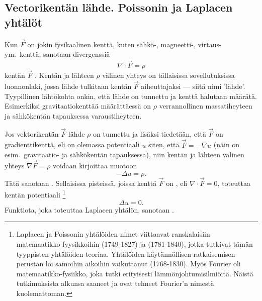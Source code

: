 \subsection*{Vectorikentän lähde. Poissonin ja Laplacen yhtälöt}

Kun $\vec F$ on jokin fysikaalinen kenttä, kuten sähkö-, magneetti-, virtaus- ym.\ kenttä, 
sanotaan divergenssiä
\[
\nabla\cdot\vec F=\rho
\]
%
kentän $\vec F$ . Kentän ja lähteen $\rho$ välinen yhteys on tällaisissa 
sovellutuksissa luonnonlaki, jossa lähde tulkitaan kentän $\vec F$ aiheuttajaksi --- siitä nimi
'lähde'. Tyypillinen lähtökohta onkin, että lähde on tunnettu ja kenttä halutaan määrätä. 
Esimerkiksi gravitaatiokenttää määrättäessä on $\rho$ verrannollinen massatiheyteen ja 
sähkökentän tapauksessa varaustiheyteen.

Jos vektorikentän $\vec F$ lähde $\rho$ on tunnettu ja lisäksi tiedetään, että $\vec F$ on 
gradienttikenttä, eli on olemassa potentiaali $u$ siten, että $\vec F = -\nabla u$ 
(näin on esim.\ gravitaatio- ja sähkökentän tapauksessa), niin kentän ja lähteen välinen yhteys
$\nabla\vec F=\rho$ voidaan kirjoittaa muotoon
\[
-\Delta u=\rho.
\]
%
Tätä sanotaan . Sellaisissa pisteissä, joissa kenttä $\vec F$ on 
, eli $\nabla\cdot\vec F=0$, toteuttaa kentän potentiaali
% 
\footnote[2]{Laplacen ja Poissonin yhtälöiden nimet viittaavat 
ranskalaisiin matemaatikko-fyysikkoihin  (1749-1827) ja 
 (1781-1840), jotka tutkivat tämän tyyppisten yhtälöiden teoriaa. Yhtälöiden
käytännöllisen ratkaisemisen perustan loi samoihin aikoihin vaikuttanut  
(1768-1830). Myös Fourier oli matemaatikko-fysiikko, joka tutki erityisesti 
lämmönjohtumisilmiöitä. Näistä tutkimuksista alkunsa saaneet  ja 
 ovat tehneet Fourier'n nimestä kuolemattoman.
   }
\[
\Delta u=0.
\]
%
Funktiota, joka toteuttaa Laplacen yhtälön, sanotaan .
 
